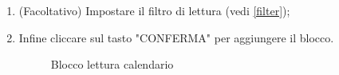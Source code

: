 \begin{enumerate}
	\item (Facoltativo) Impostare il filtro di lettura (vedi \ref{filter});
	\item Infine cliccare sul tasto "CONFERMA" per aggiungere il blocco.
	\begin{figure}[!ht]
		\centering
		\caption{Blocco lettura calendario}
	\end{figure}
\end{enumerate}
\newpage
